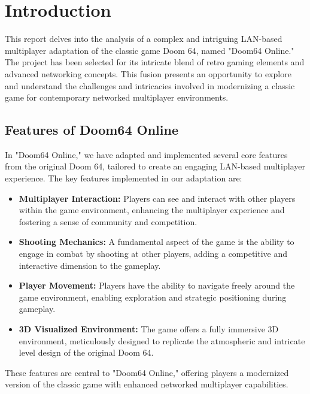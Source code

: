 
\graphicspath{ {/home/ranguy/main/projects/Doom64Online/LATEX_REPORT_TEMPLATE/Mini project report template/images/} }

\section{Introduction}
\label{chap:introduction}

This report delves into the analysis of a complex and intriguing LAN-based multiplayer adaptation of the classic game Doom 64, named "Doom64 Online." The project has been selected for its intricate blend of retro gaming elements and advanced networking concepts. This fusion presents an opportunity to explore and understand the challenges and intricacies involved in modernizing a classic game for contemporary networked multiplayer environments.

\subsection{Features of Doom64 Online}

In "Doom64 Online," we have adapted and implemented several core features from the original Doom 64, tailored to create an engaging LAN-based multiplayer experience. The key features implemented in our adaptation are:

\begin{itemize}
    \item \textbf{Multiplayer Interaction:} Players can see and interact with other players within the game environment, enhancing the multiplayer experience and fostering a sense of community and competition.
    \item \textbf{Shooting Mechanics:} A fundamental aspect of the game is the ability to engage in combat by shooting at other players, adding a competitive and interactive dimension to the gameplay.
    \item \textbf{Player Movement:} Players have the ability to navigate freely around the game environment, enabling exploration and strategic positioning during gameplay.
    \item \textbf{3D Visualized Environment:} The game offers a fully immersive 3D environment, meticulously designed to replicate the atmospheric and intricate level design of the original Doom 64.
\end{itemize}

These features are central to "Doom64 Online," offering players a modernized version of the classic game with enhanced networked multiplayer capabilities.

